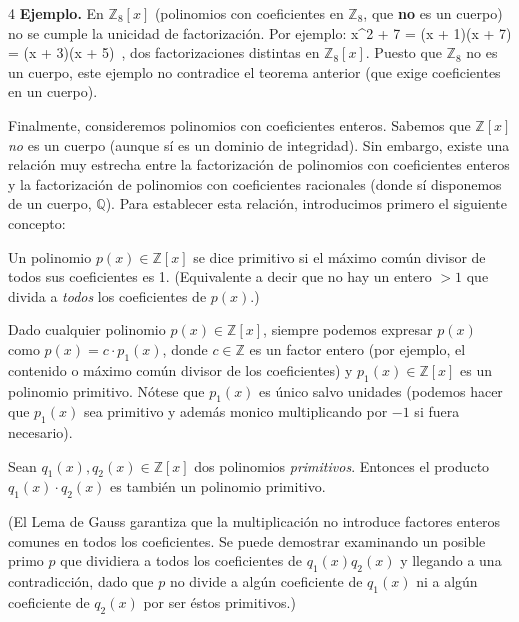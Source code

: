 \documentclass[11pt]{article}
\theoremstyle{plain}
\theoremstyle{definition}
\theoremstyle{definition}
\begin{document}
\begin{multicols}{4}
\noindent\textbf{Ejemplo.} En $\mathbb{Z}_8[x]$ (polinomios con coeficientes en $\mathbb{Z}_8$, que \textbf{no} es un cuerpo) no se cumple la unicidad de factorización. Por ejemplo:
x^2 + 7 = (x + 1)(x + 7) = (x + 3)(x + 5)~,
dos factorizaciones distintas en $\mathbb{Z}_8[x]$. Puesto que $\mathbb{Z}_8$ no es un cuerpo, este ejemplo no contradice el teorema anterior (que exige coeficientes en un cuerpo).

Finalmente, consideremos polinomios con coeficientes enteros. Sabemos que $\mathbb{Z}[x]$ \emph{no} es un cuerpo (aunque sí es un dominio de integridad). Sin embargo, existe una relación muy estrecha entre la factorización de polinomios con coeficientes enteros y la factorización de polinomios con coeficientes racionales (donde sí disponemos de un cuerpo, $\mathbb{Q}$). Para establecer esta relación, introducimos primero el siguiente concepto:

\begin{tcolorbox}[colback=blue!5!white,colframe=blue!75!black,title=\textbf{Definición (Polinomio primitivo)}]
Un polinomio $p(x) \in \mathbb{Z}[x]$ se dice primitivo si el máximo común divisor de todos sus coeficientes es 1. (Equivalente a decir que no hay un entero $>1$ que divida a \emph{todos} los coeficientes de $p(x)$.)
\end{tcolorbox}

Dado cualquier polinomio $p(x) \in \mathbb{Z}[x]$, siempre podemos expresar $p(x)$ como $p(x) = c \cdot p_1(x)$, donde $c \in \mathbb{Z}$ es un factor entero (por ejemplo, el contenido o máximo común divisor de los coeficientes) y $p_1(x) \in \mathbb{Z}[x]$ es un polinomio primitivo. Nótese que $p_1(x)$ es único salvo unidades (podemos hacer que $p_1(x)$ sea primitivo y además monico multiplicando por $-1$ si fuera necesario).

\begin{tcolorbox}[colback=red!5!white,colframe=red!75!black,title=\textbf{Lema 2.3.1 (Lema de Gauss)}]
Sean $q_1(x), q_2(x) \in \mathbb{Z}[x]$ dos polinomios \emph{primitivos}. Entonces el producto $q_1(x)\cdot q_2(x)$ es también un polinomio primitivo.
\end{tcolorbox}

(El Lema de Gauss garantiza que la multiplicación no introduce factores enteros comunes en todos los coeficientes. Se puede demostrar examinando un posible primo $p$ que dividiera a todos los coeficientes de $q_1(x)q_2(x)$ y llegando a una contradicción, dado que $p$ no divide a algún coeficiente de $q_1(x)$ ni a algún coeficiente de $q_2(x)$ por ser éstos primitivos.)


\end{multicols}
\end{document}
